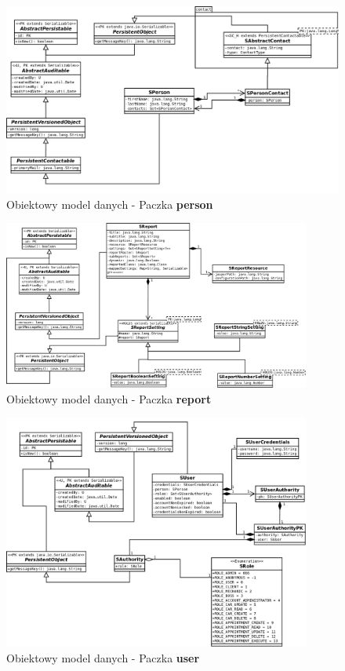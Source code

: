 	\begin{figure}[H]
		\centering
		\includegraphics[width=1.0\textwidth]{images/umls/person}
		\caption[Obiektowy model danych - Paczka \textbf{person}]{
			Obiektowy model danych - Paczka \textbf{person}
		}
		\label{app:schema_person_package}
	\end{figure}
	\begin{figure}[H]
		\centering
		\includegraphics[width=0.9\textwidth]{images/umls/report}
		\caption[Obiektowy model danych - Paczka \textbf{report}]{
			Obiektowy model danych - Paczka \textbf{report}
		}
		\label{app:schema_person_package}
	\end{figure}
	\begin{figure}[H]
		\centering
		\includegraphics[width=0.9\textwidth]{images/umls/user}
		\caption[Obiektowy model danych - Paczka \textbf{user}]{
			Obiektowy model danych - Paczka \textbf{user}
		}
		\label{app:schema_person_package}
	\end{figure}

